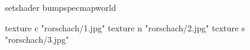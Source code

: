 setshader bumpspecmapworld

    texture c "rorschach/1.jpg"
    texture n "rorschach/2.jpg"
    texture s "rorschach/3.jpg"
